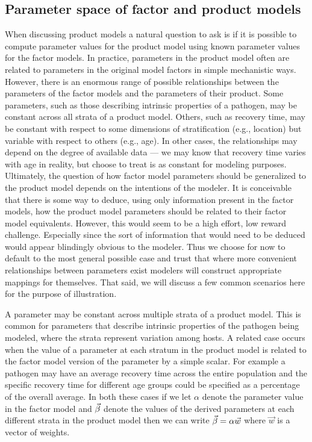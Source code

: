 \subsection{Parameter space of factor and product models}

When discussing product models a natural question to ask is if it is possible to compute parameter values for the product model using known parameter values for the factor models.
In practice, parameters in the product model often are related to parameters in the original model factors in simple mechanistic ways. However, there is an enormous range of possible relationships between the parameters of the factor models and the parameters of their product.
Some parameters, such as those describing intrinsic properties of a pathogen, may be constant across all strata of a product model. Others, such as recovery time, may be constant with respect to some dimensions of stratification (e.g., location) but variable with respect to others (e.g., age). In other cases, the relationships may depend on the degree of available data --- we may know that recovery time varies with age in reality, but choose to treat is as constant for modeling purposes. Ultimately, the question of how factor model parameters should be generalized to the product model depends on the intentions of the modeler. It is conceivable that there is some way to deduce, using only information present in the factor models, how the product model parameters should be related to their factor model equivalents. However, this would seem to be a high effort, low reward challenge. Especially since the sort of information that would need to be deduced would appear blindingly obvious to the modeler. Thus we choose for now to default to the most general possible case and trust that where more convenient relationships between parameters exist modelers will construct appropriate mappings for themselves. That said, we will discuss a few common scenarios here for the purpose of illustration. 

A parameter may be constant across multiple strata of a product model. This is common for parameters that describe intrinsic properties of the pathogen being modeled, where the strata represent variation among hosts. A related case occurs when the value of a parameter at each stratum in the product model is related to the factor model version of the parameter by a simple scalar. For example a pathogen may have an average recovery time across the entire population and the specific recovery time for different age groups could be specified as a percentage of the overall average. In both these cases if we let $\alpha$ denote the parameter value in the factor model and $\vec{\beta}$ denote the values of the derived parameters at each different strata in the product model then we can write $\vec{\beta} = \alpha\vec{w}$ where $\vec{w}$ is a vector of weights.


